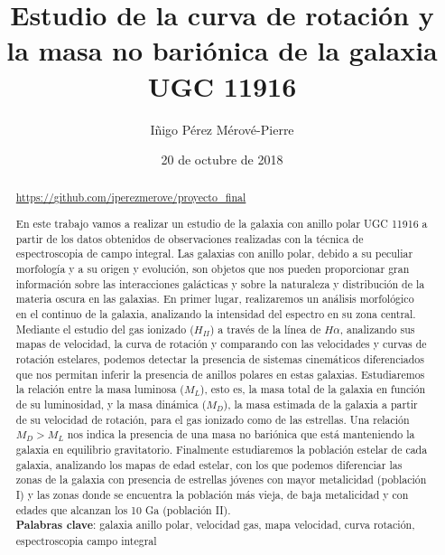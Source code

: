 \documentclass{article}
\newcommand{\hal}{$H\alpha$}
\begin{document}
\title{Estudio de la curva de rotación y la masa no bariónica de la galaxia UGC 11916}
\author{Iñigo Pérez Mérové-Pierre}
\date{20 de octubre de 2018}
\maketitle
\begin{abstract}
\url{https://github.com/iperezmerove/proyecto_final}

En este trabajo vamos a realizar un estudio de la galaxia con anillo polar UGC 11916 a partir de los datos obtenidos de observaciones realizadas con la técnica de espectroscopia de campo integral. Las galaxias con anillo polar, debido a su peculiar morfología y a su origen y evolución, son objetos que nos pueden proporcionar gran información sobre las interacciones galácticas y sobre la naturaleza y distribución de la materia oscura en las galaxias. En primer lugar, realizaremos un análisis morfológico en el continuo de la galaxia, analizando la intensidad del espectro en su zona central. Mediante el estudio del gas ionizado ($H_{II}$) a través de la línea de \hal, analizando sus mapas de velocidad, la curva de rotación y comparando con las velocidades y curvas de rotación estelares, podemos detectar la presencia de sistemas cinemáticos diferenciados que nos permitan inferir la presencia de anillos polares en estas galaxias. Estudiaremos la relación entre la masa luminosa ($M_{L}$), esto es, la masa total de la galaxia en función de su luminosidad, y la masa dinámica ($M_{D}$), la masa estimada de la galaxia a partir de su velocidad de rotación, para el gas ionizado como de las estrellas. Una relación $M_{D}>M_{L}$ nos indica la presencia de una masa no bariónica que está manteniendo la galaxia en equilibrio gravitatorio. Finalmente estudiaremos la población estelar de cada galaxia, analizando los mapas de edad estelar, con los que podemos diferenciar las zonas de la galaxia con presencia de estrellas jóvenes con mayor metalicidad (población I) y las zonas donde se encuentra la población más vieja, de baja metalicidad y con edades que alcanzan los 10 Ga (población II).\\\textbf{Palabras clave}: galaxia anillo polar, velocidad  gas, mapa velocidad, curva rotación, espectroscopia campo integral 
\end{abstract}
\end{document}
